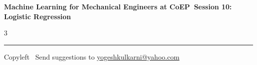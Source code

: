 \documentclass[8pt,landscape]{article}
\begin{document}
\footnotesize

\begin{center}
\Large{\textbf{Machine Learning for Mechanical Engineers at CoEP\ Session 10: Logistic Regression}}
\end{center}

\begin{multicols}{3}

\end{multicols}

\rule{\linewidth}{0.25pt}
\scriptsize
Copyleft \textcopyleft\  Send suggestions to
\href{http://www.yogeshkulkarni.com}{yogeshkulkarni@yahoo.com}
\end{document}
